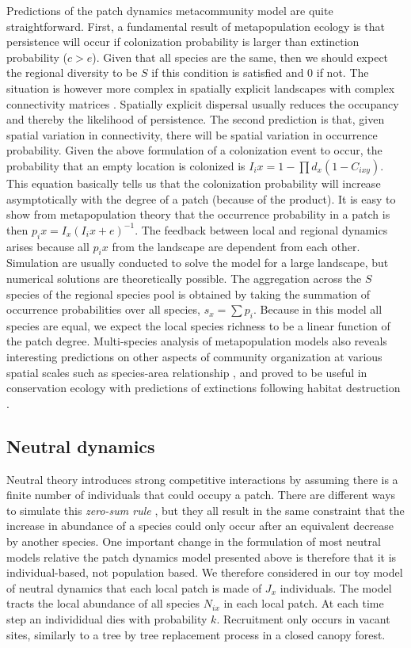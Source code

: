 \documentclass[12pt]{article}
\begin{document}
Predictions of the patch dynamics metacommunity model are quite straightforward. First, a fundamental result of metapopulation ecology is that persistence will occur if colonization probability is larger than extinction probability ($c>e$). Given that all species are the same, then we should expect the regional diversity to be $S$ if this condition is satisfied and $0$ if not. The situation is however more complex in spatially explicit landscapes with complex connectivity matrices \parencite{Hanski1998}. Spatially explicit dispersal usually reduces the occupancy and thereby the likelihood of persistence. The second prediction is that, given spatial variation in connectivity, there will be spatial variation in occurrence probability. Given the above formulation of a colonization event to occur, the probability that an empty location is colonized is $I_ix=1-\prod d_x(1-C_{ixy})$. This equation basically tells us that the colonization probability will increase asymptotically with the degree of a patch (because of the product). It is easy to show from metapopulation theory that the occurrence probability in a patch is then $p_ix=I_x(I_ix+e)^{-1}$. The feedback between local and regional dynamics arises because all $p_ix$ from the landscape are dependent from each other. Simulation are usually conducted to solve the model for a large landscape, but numerical solutions are theoretically possible. The aggregation across the $S$ species of the regional species pool is obtained by taking the summation of occurrence probabilities over all species, $s_x = \sum{p_i}$. Because in this model all species are equal, we expect the local species richness to be a linear function of the patch degree. Multi-species analysis of metapopulation models also reveals interesting predictions on other aspects of community organization at various spatial scales such as species-area relationship \parencite{Hanski1997}, and proved to be useful in conservation ecology with predictions of extinctions following habitat destruction \parencite{Nee1994,Rybicki2013}.

\subsection*{Neutral dynamics}

Neutral theory introduces strong competitive interactions by assuming there is a finite number of individuals that could occupy a  patch. There are different ways to simulate this \emph{zero-sum rule} \parencite{Bell2000,Hubbell2001}, but they all result in the same constraint that the increase in abundance of a species could only occur after an equivalent decrease by another species. One important change in the formulation of most neutral models relative the patch dynamics model presented above is therefore that it is individual-based, not population based. We therefore considered in our toy model of neutral dynamics that each local patch is made of $J_x$ individuals. The model tracts the local abundance of all species $N_{ix}$ in each local patch. At each time step an individidual dies with probability $k$. Recruitment only occurs in vacant sites, similarly to a tree by tree replacement process in a closed canopy forest. 
\end{document}
